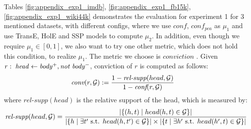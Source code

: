 Tables \ref{fig:appendix_exp1_imdb}, \ref{fig:appendix_exp1_fb15k}, \ref{fig:appendix_exp1_wiki44k} demonstrates the evaluation for experiment 1 for 3 mentioned datasets, with different configs, where we use $conf$, $conf_{pca}$ as $\mu_1$ and use TransE, HolE and SSP models to compute $\mu_2$. In addition, even though we require $\mu_1 \in [0,1]$, we also want to try one other metric, which does not hold this condition, to realize $\mu_1$. The metric we choose is $conviction$ \cite{trantowards}. Given $\mathit{r:\; head\leftarrow body^+, not\;  body^-}$, conviction of $r$ is computed as follows:
\begin{align*}
\textit{conv}(r,\mathcal{G}) & := \frac{1 - \textit{rel-supp}(head, \mathcal{G})}{1-\textit{conf}(r,\mathcal{G})}
\end{align*}
where $\textit{rel-supp}(head)$ is the relative support of the head, which is measured by:
\begin{align*}
\textit{rel-supp}(head, \mathcal{G}) = \frac{|\{(h, t) \mid head(h,t) \in \mathcal{G}\}|}{|\{h \mid \exists t' \text{ s.t. }head(h,t') \in \mathcal{G}\}| \times |\{t \mid \exists h'\text{ s.t. } head(h',t) \in \mathcal{G}\}|}
\end{align*}

